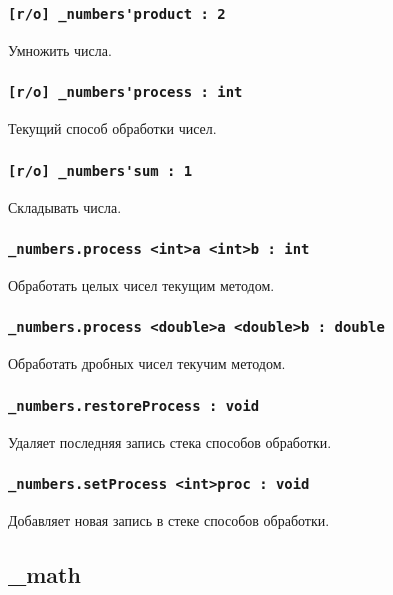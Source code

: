 \documentclass[a4paper, 14pt]{extarticle}
\begin{document}
\subsubsection{\lstinline|[r/o] _numbers'product : 2|}

Умножить числа.

\subsubsection{\lstinline|[r/o] _numbers'process : int|}

Текущий способ обработки чисел.

\subsubsection{\lstinline|[r/o] _numbers'sum : 1|}

Складывать числа.

\subsubsection{\lstinline|_numbers.process <int>a <int>b : int|}

Обработать целых чисел текущим методом.

\subsubsection{\lstinline|_numbers.process <double>a <double>b : double|}

Обработать дробных чисел текучим методом.

\subsubsection{\lstinline|_numbers.restoreProcess : void|}

Удаляет последняя запись стека способов обработки.

\subsubsection{\lstinline|_numbers.setProcess <int>proc : void|}

Добавляет новая запись в стеке способов обработки.

\subsection{{\color{orange} \_math}}
\end{document}
